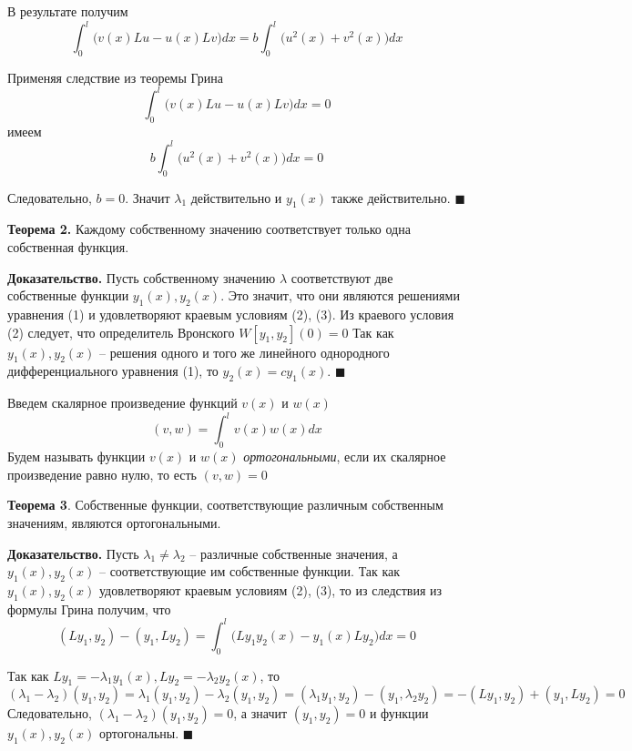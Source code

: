 В результате получим
\begin{equation}\nonumber
\int_{0}^{l}\big(v(x)Lu-u(x)Lv\big)dx = b\int_{0}^{l}\big(u^2(x)+v^2(x)\big)dx
\end{equation}

Применяя следствие из теоремы Грина
\begin{equation}
    \int_{0}^{l}\big(v(x)Lu-u(x)Lv\big)dx = 0
\end{equation}
имеем
\begin{equation}\nonumber
b\int_{0}^{l}\big(u^2(x)+v^2(x)\big)dx = 0
\end{equation}

Следовательно, $b=0$. Значит $\lambda_1$ действительно и $y_1(x)$ также действительно. $\blacksquare$

\textbf{Теорема 2.} Каждому собственному значению соответствует
только одна собственная функция.

\textbf{Доказательство.} Пусть собственному значению $\lambda$ соответствуют две
собственные функции $y_1(x), y_2(x)$. Это значит, что они являются решениями уравнения (1) и удовлетворяют краевым условиям (2),
(3). Из краевого условия (2) следует, что определитель Вронского $W [y_1, y_2](0) = 0$ Так как $y_1(x), y_2(x)$ – решения одного и того же линейного однородного дифференциального уравнения (1), то
$y_2(x) = cy_1(x)$. $\blacksquare$

Введем скалярное произведение функций $v(x)$ и $w(x)$
\begin{equation}\nonumber
(v,w)=\int_{0}^{l}v(x)w(x)dx
\end{equation}
Будем называть функции $v(x)$ и $w(x)$ \textit{ортогональными}, если их скалярное произведение равно нулю, то есть $(v, w) = 0$

\textbf{Теорема 3}. Собственные функции, соответствующие различным собственным значениям, являются ортогональными.

\textbf{Доказательство.} Пусть $\lambda_1 \neq \lambda_2$ – различные собственные значения, а $y_1(x), y_2(x)$ – соответствующие им собственные функции. Так как $y_1(x), y_2(x)$ удовлетворяют краевым условиям (2), (3), то из следствия
из формулы Грина получим, что
\begin{equation}\nonumber
(Ly_1,y_2)-(y_1,Ly_2)= \int_{0}^{l}\big( Ly_1 y_2(x) - y_1(x) Ly_2 \big) dx = 0
\end{equation}

Так как $Ly_1 = -\lambda_1y_1(x), Ly_2 = -\lambda_2y_2(x)$, то
\begin{equation}\nonumber
(\lambda_1-\lambda_2)(y_1,y_2)=\lambda_1(y_1,y_2)-\lambda_2(y_1,y_2)=(\lambda_1 y_1,y_2)-(y_1,\lambda_2 y_2)=-(Ly_1,y_2)+(y_1,Ly_2)=0
\end{equation}
Следовательно, $(\lambda_1 - \lambda_2)(y_1, y_2) = 0$, а значит $(y_1, y_2) = 0$ и функции
$y_1(x), y_2(x)$ ортогональны. $\blacksquare$

